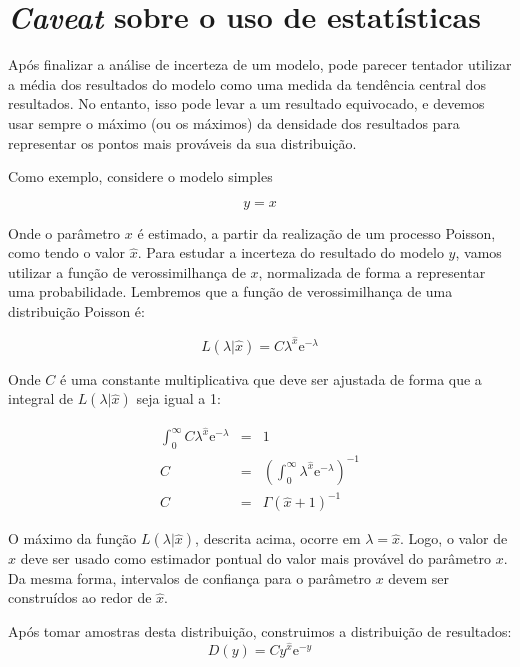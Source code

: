 \section{{\em Caveat} sobre o uso de estatísticas}

Ap\'os finalizar a an\'alise de incerteza de um modelo, pode parecer
tentador utilizar a m\'edia dos resultados do modelo como uma medida
da tend\^encia central dos resultados. No entanto, isso pode levar
a um resultado equivocado, e devemos usar sempre o m\'aximo
(ou os m\'aximos) da densidade dos resultados para representar os
pontos mais prov\'aveis da sua distribui\c c\~ao.

Como exemplo, considere o modelo simples

\begin{equation}
	y = x
\end{equation}

Onde o par\^ametro $x$ \'e estimado, a partir da realiza\c c\~ao de um
processo Poisson, como tendo o valor $\hat x$. Para estudar a incerteza
do resultado do modelo $y$, vamos utilizar a fun\c c\~ao de verossimilhan\c ca
de $x$, normalizada de forma a representar uma probabilidade. Lembremos que
a fun\c c\~ao de verossimilhan\c ca de uma distribui\c c\~ao Poisson
\'e:

\begin{equation}
	L \left( \lambda | \hat x \right) = C \lambda^{\hat x} \mathrm{e}^{-\lambda}
\end{equation}

Onde $C$ \'e uma constante multiplicativa que deve ser ajustada de forma
que a integral de $L(\lambda | \hat x)$ seja igual a 1:

\begin {eqnarray*}
\int_0^\infty C \lambda^{\hat x} \mathrm{e}^{-\lambda} & = & 1 \\
C & = & \left( \int_0^\infty  \lambda^{\hat x} \mathrm{e}^{-\lambda} \right)^{-1} \\
C & = & \Gamma(\hat x +1)^{-1}
\end{eqnarray*}

O m\'aximo da fun\c c\~ao $L(\lambda | \hat x)$, descrita acima, ocorre em $\lambda = \hat x$.
Logo, o valor de $\hat x$ deve ser usado como estimador pontual do valor mais prov\'avel
do par\^ametro $x$. Da mesma forma, intervalos de confian\c ca para o par\^ametro $x$ devem
ser constru\'idos ao redor de $\hat x$.

Ap\'os tomar amostras desta distribui\c c\~ao, construimos a distribui\c c\~ao
de resultados:
\begin{equation}
	D(y) = C y^{\hat x} \mathrm{e}^{-y}
\end{equation}

